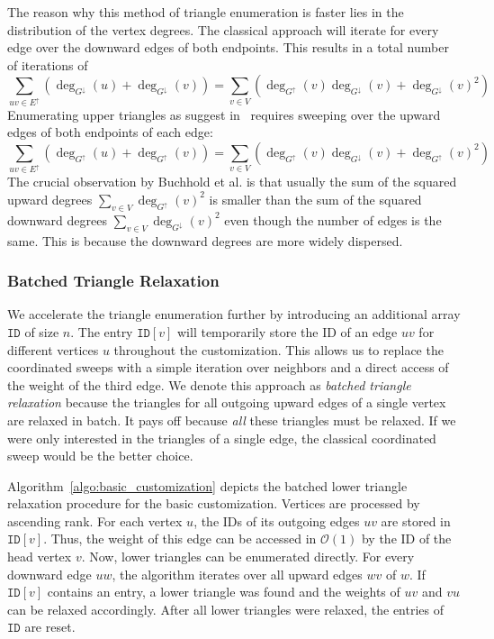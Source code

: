 \documentclass[a4paper, english, cleveref]{lipics-v2021}
\newcommand*{\gchu}{G^{\uparrow}}
\newcommand*{\gchd}{G^{\downarrow}}
\newcommand*{\echu}{E^{\uparrow}}
\begin{document}
The reason why this method of triangle enumeration is faster lies in the distribution of the vertex degrees.
The classical approach will iterate for every edge over the downward edges of both endpoints.
This results in a total number of iterations of
\[
\sum_{uv \in \echu} \left( \deg_{\gchd}(u) + \deg_{\gchd}(v) \right) = \sum_{v \in V}\left( \deg_{\gchu}(v)\deg_{\gchd}(v) + \deg_{\gchd}(v)^2 \right)
\]
Enumerating upper triangles as suggest in~\cite{BuchholdSW19} requires sweeping over the upward edges of both endpoints of each edge:
\[
\sum_{uv \in \echu} \left( \deg_{\gchu}(u) + \deg_{\gchu}(v) \right) = \sum_{v \in V}( \deg_{\gchu}(v)\deg_{\gchd}(v) + \deg_{\gchu}(v)^2 )
\]
The crucial observation by Buchhold et al. is that usually  the sum of the squared upward degrees $\sum_{v \in V} \deg_{\gchu}(v)^2$ is smaller than the sum of the squared downward degrees $\sum_{v \in V} \deg_{\gchd}(v)^2$ even though the number of edges is the same.
This is because the downward degrees are more widely dispersed.

\subsubsection{Batched Triangle Relaxation}

We accelerate the triangle enumeration further by introducing an additional array $\mathtt{ID}$ of size $n$.
The entry $\mathtt{ID}[v]$ will temporarily store the ID of an edge $uv$ for different vertices $u$ throughout the customization. %
This allows us to replace the coordinated sweeps with a simple iteration over neighbors and a direct access of the weight of the third edge.
We denote this approach as \emph{batched triangle relaxation} because the triangles for all outgoing upward edges of a single vertex are relaxed in batch.
It pays off because \emph{all} these triangles must be relaxed.
If we were only interested in the triangles of a single edge, the classical coordinated sweep would be the better choice.

Algorithm~\ref{algo:basic_customization} depicts the batched lower triangle relaxation procedure for the basic customization.
Vertices are processed by ascending rank.
For each vertex $u$, the IDs of its outgoing edges $uv$ are stored in $\mathtt{ID}[v]$.
Thus, the weight of this edge can be accessed in $\mathcal{O}(1)$ by the ID of the head vertex $v$.
Now, lower triangles can be enumerated directly.
For every downward edge $uw$, the algorithm iterates over all upward edges $wv$ of $w$.
If $\mathtt{ID}[v]$ contains an entry, a lower triangle was found and the weights of $uv$ and $vu$ can be relaxed accordingly.
After all lower triangles were relaxed, the entries of $\mathtt{ID}$ are reset.
\end{document}
